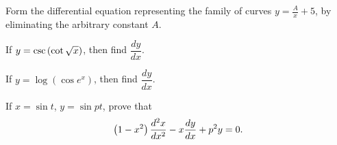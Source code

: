   \item Form the differential equation representing the family of curves $y=\frac{A}{x}+5$, by eliminating the arbitrary constant $A$.

    \item If $y=\csc{\ensuremath{\left(\cot{\sqrt{x}}\right)}}$, then find $\dfrac{dy}{dx}$.

    \item If $y=\log(\cos{e^x})$, then find $\dfrac{dy}{dx}$.

    \item If $x = \sin{t}$, $y = \sin{pt}$, prove that
    \begin{align*}
    \left(1-x^{2}\right)\dfrac{d^{2}x}{dx^{2}}-x\dfrac{dy}{dx}+p^{2}y=0.
    \end{align*}
 
